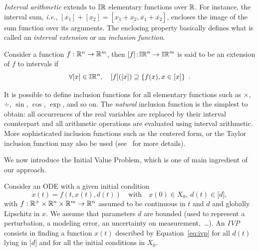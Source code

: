 \textit{Interval arithmetic} extends to $\mathbb{IR}$ elementary functions
over $\mathbb{R}$. For instance, the interval sum, \textit{i.e.},
$[x_1]+[x_2]=[\underline{x_1}+\underline{x_2},
\overline{x_1}+\overline{x_2}]$, encloses the image of the sum
function over its arguments. The enclosing property basically defines
what is called an {\it interval extension} or an \emph{inclusion
  function}.

\begin{definition}
  Consider a function $f: \mathbb{R}^n \rightarrow \mathbb{R}^m$, then $[f]\!:\!
  \mathbb{IR}^n \rightarrow \mathbb{IR}^m$ is said to be an extension of $f$ to
  intervals if
  \begin{displaymath}
    \forall [{x}] \in \mathbb{IR}^n, \quad [f]([{x}])
    \supseteq \{f({x}), {x} \in [{x}]\}\enspace.
  \end{displaymath}
\end{definition}

It is possible to define inclusion functions for all elementary
functions such as $\times$, $\div$, $\sin$, $\cos$, $\exp$, and so
on. The \emph{natural} inclusion function is the simplest to obtain:
all occurrences of the real variables are replaced by their interval
counterpart and all arithmetic operations are evaluated using interval
arithmetic. More sophisticated inclusion functions such as the
centered form, or the Taylor inclusion function may also be used
(see~\cite{JKDW01} for more details).

We now introduce the Initial Value Problem, which is one of main
ingredient of our approach.

\begin{definition}
  Consider an ODE with a given initial condition
  \begin{equation}
    \label{eq:ivp}
    \dot{x}(t) = f(t, x(t), d(t))\quad\text{with}
    \quad x(0) \in X_0, \ d(t) \in \lbrack d \rbrack,
  \end{equation}
  with $f:\mathbb{R}^+\times\mathbb{R}^n\times \mathbb{R}^m\rightarrow\mathbb{R}^n$
  assumed to be continuous in $t$ and $d$ and globally Lipschitz in
  $x$. We assume that parameters $d$ are bounded (used to represent a
  perturbation, a modeling error, an uncertainty on
  measurement,~\dots).  An \emph{IVP} consists in finding a function
  $x(t)$ described by Equation~\eqref{eq:ivp} for all 
  $d(t)$ lying in $\lbrack d \rbrack$ and for all the initial
  conditions in $X_0$.
\end{definition}



